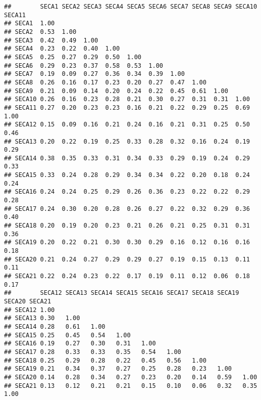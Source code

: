 \documentclass[
]{article}
\begin{document}
\begin{verbatim}
##        SECA1 SECA2 SECA3 SECA4 SECA5 SECA6 SECA7 SECA8 SECA9 SECA10 SECA11
## SECA1  1.00                                                               
## SECA2  0.53  1.00                                                         
## SECA3  0.42  0.49  1.00                                                   
## SECA4  0.23  0.22  0.40  1.00                                             
## SECA5  0.25  0.27  0.29  0.50  1.00                                       
## SECA6  0.29  0.23  0.37  0.58  0.53  1.00                                 
## SECA7  0.19  0.09  0.27  0.36  0.34  0.39  1.00                           
## SECA8  0.26  0.16  0.17  0.23  0.20  0.27  0.47  1.00                     
## SECA9  0.21  0.09  0.14  0.20  0.24  0.22  0.45  0.61  1.00               
## SECA10 0.26  0.16  0.23  0.28  0.21  0.30  0.27  0.31  0.31  1.00         
## SECA11 0.27  0.20  0.23  0.23  0.16  0.21  0.22  0.29  0.25  0.69   1.00  
## SECA12 0.15  0.09  0.16  0.21  0.24  0.16  0.21  0.31  0.25  0.50   0.46  
## SECA13 0.20  0.22  0.19  0.25  0.33  0.28  0.32  0.16  0.24  0.19   0.29  
## SECA14 0.38  0.35  0.33  0.31  0.34  0.33  0.29  0.19  0.24  0.29   0.33  
## SECA15 0.33  0.24  0.28  0.29  0.34  0.34  0.22  0.20  0.18  0.24   0.24  
## SECA16 0.24  0.24  0.25  0.29  0.26  0.36  0.23  0.22  0.22  0.29   0.28  
## SECA17 0.24  0.30  0.20  0.28  0.26  0.27  0.22  0.32  0.29  0.36   0.40  
## SECA18 0.20  0.19  0.20  0.23  0.21  0.26  0.21  0.25  0.31  0.31   0.36  
## SECA19 0.20  0.22  0.21  0.30  0.30  0.29  0.16  0.12  0.16  0.16   0.18  
## SECA20 0.21  0.24  0.27  0.29  0.29  0.27  0.19  0.15  0.13  0.11   0.11  
## SECA21 0.22  0.24  0.23  0.22  0.17  0.19  0.11  0.12  0.06  0.18   0.17  
##        SECA12 SECA13 SECA14 SECA15 SECA16 SECA17 SECA18 SECA19 SECA20 SECA21
## SECA12 1.00                                                                 
## SECA13 0.30   1.00                                                          
## SECA14 0.28   0.61   1.00                                                   
## SECA15 0.25   0.45   0.54   1.00                                            
## SECA16 0.19   0.27   0.30   0.31   1.00                                     
## SECA17 0.28   0.33   0.33   0.35   0.54   1.00                              
## SECA18 0.25   0.29   0.28   0.22   0.45   0.56   1.00                       
## SECA19 0.21   0.34   0.37   0.27   0.25   0.28   0.23   1.00                
## SECA20 0.14   0.28   0.34   0.27   0.23   0.20   0.14   0.59   1.00         
## SECA21 0.13   0.12   0.21   0.21   0.15   0.10   0.06   0.32   0.35   1.00
\end{verbatim}
\end{document}
